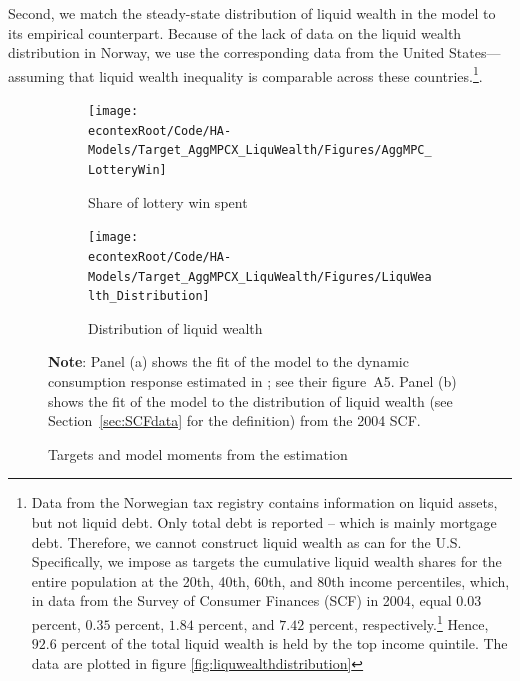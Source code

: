 \documentclass[\econtexRoot/HAFiscal]{subfiles}
\begin{document}
Second, we match the steady-state distribution of liquid wealth in the model to its empirical counterpart. Because of the lack of data on the liquid wealth distribution in Norway, we use the corresponding data from the United States---assuming that liquid wealth inequality is comparable across these countries.\footnote{Data from the Norwegian tax registry contains information on liquid assets, but not liquid debt. Only total debt is reported -- which is mainly mortgage debt. Therefore, we cannot construct liquid wealth as \citet{kaplan2014model} can for the U.S. \notinsubfile{\label{foot:liqwealth}} Specifically, we impose as targets the cumulative liquid wealth shares for the entire population at the 20th, 40th, 60th, and 80th income percentiles, which, in data from the Survey of Consumer Finances (SCF) in 2004, equal $0.03$ percent, $0.35$ percent, $1.84$ percent, and $7.42$ percent, respectively.\footnote{See section~\ref{sec:SCFdata} for details.} Hence, $92.6$ percent of the total liquid wealth is held by the top income quintile. The data are plotted in figure \ref{fig:liquwealthdistribution}}.

\begin{figure}[htb]
  \centering
  \begin{subfigure}[b]{.48\linewidth}
    \centering
    \texttt{[image: \\econtexRoot/Code/HA-Models/Target\_AggMPCX\_LiquWealth/Figures/AggMPC\_LotteryWin]}
    \caption{Share of lottery win spent}
    \notinsubfile{\label{fig:aggmpclotterywin}}
  \end{subfigure}
  \begin{subfigure}[b]{.48\linewidth}
    \centering
    \texttt{[image: \\econtexRoot/Code/HA-Models/Target\_AggMPCX\_LiquWealth/Figures/LiquWealth\_Distribution]}
    \caption{Distribution of liquid wealth}
    \notinsubfile{\label{fig:liquwealthdistribution}}
  \end{subfigure}%
  \caption{Targets and model moments from the estimation}
  \notinsubfile{\label{fig:splurge_estimation}}
  \parbox{16cm}{\small \vspace{.15cm} \textbf{Note}: Panel (a) shows the fit of the model to the dynamic consumption response estimated in \citet{fagereng_mpc_2021}; see their figure~A5. Panel (b) shows the fit of the model to the distribution of liquid wealth (see Section~\ref{sec:SCFdata} for the definition) from the 2004 SCF.\normalsize}
\end{figure}
\end{document}
